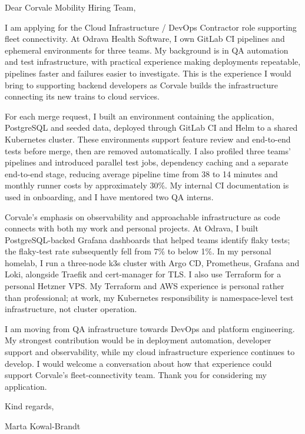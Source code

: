\documentclass[11pt,a4paper]{article}
\begin{document}
Dear Corvale Mobility Hiring Team,

I am applying for the Cloud Infrastructure / DevOps Contractor role supporting fleet connectivity. At Odrava Health Software, I own GitLab CI pipelines and ephemeral environments for three teams. My background is in QA automation and test infrastructure, with practical experience making deployments repeatable, pipelines faster and failures easier to investigate. This is the experience I would bring to supporting backend developers as Corvale builds the infrastructure connecting its new trains to cloud services.

For each merge request, I built an environment containing the application, PostgreSQL and seeded data, deployed through GitLab CI and Helm to a shared Kubernetes cluster. These environments support feature review and end-to-end tests before merge, then are removed automatically. I also profiled three teams' pipelines and introduced parallel test jobs, dependency caching and a separate end-to-end stage, reducing average pipeline time from 38 to 14 minutes and monthly runner costs by approximately 30\%. My internal CI documentation is used in onboarding, and I have mentored two QA interns.

Corvale's emphasis on observability and approachable infrastructure as code connects with both my work and personal projects. At Odrava, I built PostgreSQL-backed Grafana dashboards that helped teams identify flaky tests; the flaky-test rate subsequently fell from 7\% to below 1\%. In my personal homelab, I run a three-node k3s cluster with Argo CD, Prometheus, Grafana and Loki, alongside Traefik and cert-manager for TLS. I also use Terraform for a personal Hetzner VPS. My Terraform and AWS experience is personal rather than professional; at work, my Kubernetes responsibility is namespace-level test infrastructure, not cluster operation.

I am moving from QA infrastructure towards DevOps and platform engineering. My strongest contribution would be in deployment automation, developer support and observability, while my cloud infrastructure experience continues to develop. I would welcome a conversation about how that experience could support Corvale's fleet-connectivity team. Thank you for considering my application.

Kind regards,\par
Marta Kowal-Brandt
\end{document}
